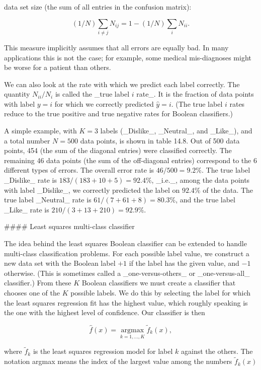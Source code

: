data set size (the sum of all entries in the confusion matrix):

\[(1/N)\sum_{i\neq j}N_{ij}=1-(1/N)\sum_{i}N_{ii}.\]

This measure implicitly assumes that all errors are equally bad. In many applications this is not the case; for example, some medical mis-diagnoses might be worse for a patient than others.

We can also look at the rate with which we predict each label correctly. The quantity \(N_{ii}/N_{i}\) is called the _true label \(i\) rate_. It is the fraction of data points with label \(y=i\) for which we correctly predicted \(\hat{y}=i\). (The true label \(i\) rates reduce to the true positive and true negative rates for Boolean classifiers.)

A simple example, with \(K=3\) labels (_Dislike_, _Neutral_, and _Like_), and a total number \(N=500\) data points, is shown in table 14.8. Out of 500 data points, 454 (the sum of the diagonal entries) were classified correctly. The remaining 46 data points (the sum of the off-diagonal entries) correspond to the 6 different types of errors. The overall error rate is \(46/500=9.2\%\). The true label _Dislike_ rate is \(183/(183+10+5)=92.4\%\), _i.e._, among the data points with label _Dislike_, we correctly predicted the label on \(92.4\%\) of the data. The true label _Neutral_ rate is \(61/(7+61+8)=80.3\%\), and the true label _Like_ rate is \(210/(3+13+210)=92.9\%\).

#### Least squares multi-class classifier

The idea behind the least squares Boolean classifier can be extended to handle multi-class classification problems. For each possible label value, we construct a new data set with the Boolean label \(+1\) if the label has the given value, and \(-1\) otherwise. (This is sometimes called a _one-versus-others_ or _one-versus-all_ classifier.) From these \(K\) Boolean classifiers we must create a classifier that chooses one of the \(K\) possible labels. We do this by selecting the label for which the least squares regression fit has the highest value, which roughly speaking is the one with the highest level of confidence. Our classifier is then

\[\hat{f}(x)=\operatorname*{argmax}_{k=1,\ldots,K}\tilde{f}_{k}(x),\]

where \(\tilde{f}_{k}\) is the least squares regression model for label \(k\) against the others. The notation argmax means the index of the largest value among the numbers \(\tilde{f}_{k}(x)\)

